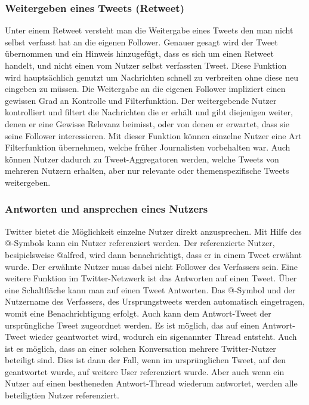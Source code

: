 		\subsubsection{Weitergeben eines Tweets (Retweet)}
			Unter einem Retweet versteht man die Weitergabe eines Tweets den man nicht selbst verfasst hat an die eigenen Follower.
			Genauer gesagt wird der Tweet übernommen und ein Hinweis hinzugefügt, dass es sich um einen Retweet handelt, und nicht einen vom Nutzer selbst verfassten Tweet.
			Diese Funktion wird hauptsächlich genutzt um Nachrichten schnell zu verbreiten ohne diese neu eingeben zu müssen. 
			Die Weitergabe an die eigenen Follower impliziert einen gewissen Grad an Kontrolle und Filterfunktion.
			Der weitergebende Nutzer kontrolliert und filtert die Nachrichten die er erhält und gibt diejenigen weiter, denen er eine Gewisse Relevanz beimisst, oder von denen er erwartet, dass sie seine Follower interessieren.  
			Mit dieser Funktion können einzelne Nutzer eine Art Filterfunktion übernehmen, welche früher Journalisten vorbehalten war. 
			Auch können Nutzer dadurch zu Tweet-Aggregatoren werden, welche Tweets von mehreren Nutzern erhalten, aber nur relevante oder themenspezifische Tweets weitergeben.




		\subsubsection{Antworten und ansprechen eines Nutzers}
			Twitter bietet die Möglichkeit einzelne Nutzer direkt anzusprechen. 
			Mit Hilfe des @-Symbols kann ein Nutzer referenziert werden. 
			Der referenzierte Nutzer, besipielsweise @alfred, wird dann benachrichtigt, dass er in einem Tweet erwähnt wurde. 
			Der erwähnte Nutzer muss dabei nicht Follower des Verfassers sein.
			Eine weitere Funktion im Twitter-Netzwerk ist das Antworten auf einen Tweet.
			Über eine Schaltfläche kann man auf einen Tweet Antworten. 
			Das @-Symbol und der Nutzername des Verfassers, des Ursprungstweets werden automatisch eingetragen, womit eine Benachrichtigung erfolgt. 
			Auch kann dem Antwort-Tweet der ursprüngliche Tweet zugeordnet werden.
			Es ist möglich, das auf einen Antwort-Tweet wieder geantwortet wird, wodurch ein sigenannter Thread entsteht. 
			Auch ist es möglich, dass an einer solchen Konversation mehrere Twitter-Nutzer beteiligt sind. 
			Dies ist dann der Fall, wenn im ursprünglichen Tweet, auf den geantwortet wurde, auf weitere User referenziert wurde. 
			Aber auch wenn ein Nutzer auf einen bestheneden Antwort-Thread wiederum antwortet, werden alle beteiligtien Nutzer referenziert. 


